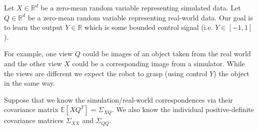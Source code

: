 Let $X \in \mathbb{R}^d$ be a zero-mean random variable representing simulated
data. Let $Q \in \mathbb{R}^d$ be a zero-mean random variable representing
real-world data. Our goal is to learn 
the output $Y \in \mathbb{R}$ which is some
bounded control signal (i.e. $Y \in [-1,1]$).

For example, one view $Q$ could be images of an object taken from the real world and the other
view $X$ could be a corresponding image from a simulator.  While the
views are different we expect the robot to grasp (using control $Y$)
the object in the same way.

Suppose that we know the simulation/real-world
correspondences via their covariance matrix $\mathbb{E}[X Q^T] = \Sigma_{XQ}$.
We also know the individual
positive-definite covariance matrices $\Sigma_{XX}$ and $\Sigma_{QQ}$. 

  

